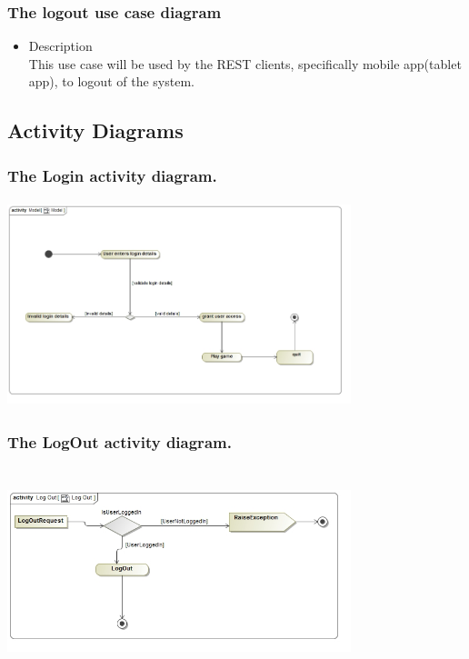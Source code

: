 \documentclass[english]{article}
\begin{document}
		\subsubsection* {The logout use case diagram}
		\begin{itemize}
			\item Description\\
			This use case will be used by the REST clients, specifically mobile app(tablet app), to logout of the system.
		\end{itemize}
		
	
		
	
		
		\subsection{Activity Diagrams}		
		
		\subsubsection* {The Login activity diagram.}
		\includegraphics[width=10cm,height=6cm,keepaspectratio]{Model.jpg}		
		
		\subsubsection* {The LogOut activity diagram.}
		\includegraphics[width=10cm,height=6cm,keepaspectratio]{LogOut.jpg}	
		
\end{document}
